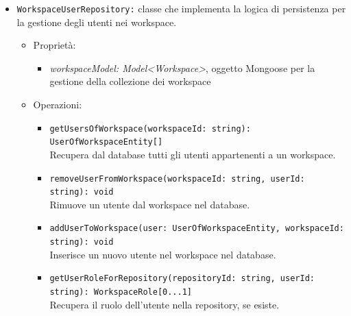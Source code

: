 \documentclass[a4paper, 11pt]{article}
\begin{document}
\begin{itemize}
\begin{itemize}
\begin{itemize}
\begin{itemize}
              \item \texttt{addUserToWorkspace(user: UserOfWorkspaceInfo, workspaceId: string): void} \\
              Aggiunge un utente al workspace dopo aver verificato che non sia già presente.
              
              \item \texttt{checkIfUserIsInWorkspace(workspaceId: string, userId: string): boolean} \\
              Verifica se un utente appartiene al workspace.
          \end{itemize}
        \end{itemize}
        
        
        \item \texttt{WorkspaceUserRepository:} classe che implementa la logica di persistenza per la gestione degli utenti nei workspace.
        \begin{itemize}
					\item Proprietà:
						\begin{itemize}
							\item \textit{workspaceModel: Model<Workspace>}, oggetto Mongoose per la gestione della collezione dei workspace
						\end{itemize}
					\item Operazioni:
            \begin{itemize}
                \item \texttt{getUsersOfWorkspace(workspaceId: string): UserOfWorkspaceEntity[]} \\
                Recupera dal database tutti gli utenti appartenenti a un workspace.
                
                \item \texttt{removeUserFromWorkspace(workspaceId: string, userId: string): void} \\
                Rimuove un utente dal workspace nel database.
                
                \item \texttt{addUserToWorkspace(user: UserOfWorkspaceEntity, workspaceId: string): void} \\
                Inserisce un nuovo utente nel workspace nel database.
                
                \item \texttt{getUserRoleForRepository(repositoryId: string, userId: string): WorkspaceRole[0...1]} \\
                Recupera il ruolo dell'utente nella repository, se esiste.
                

\end{itemize}
\end{itemize}
\end{itemize}
\end{itemize}
\end{document}
